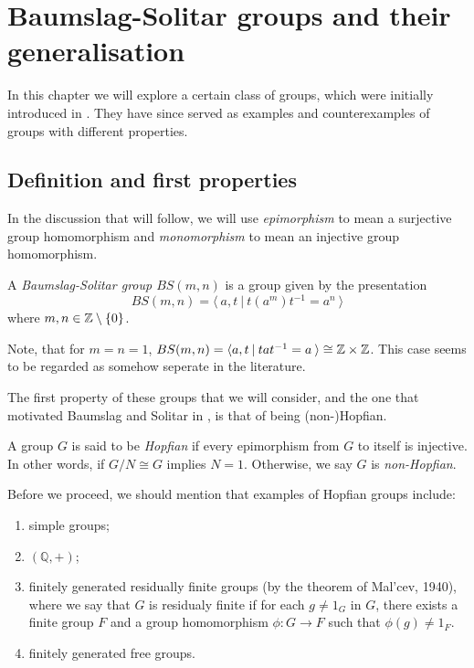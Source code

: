 \pagebreak %

\section{Baumslag-Solitar groups and their generalisation}
\label{BSGroups} %

In this chapter we will explore a certain class of groups, which were initially introduced in \cite{BaSo62}. They have since served as examples and counterexamples of groups with different properties.

\subsection{Definition and first properties}

\begin{remark}
    In the discussion that will follow, we will use \emph{epimorphism} to mean a surjective group homomorphism and \emph{monomorphism} to mean an injective group homomorphism.
\end{remark}

\begin{definition}
    A \emph{Baumslag-Solitar group $BS(m,n)$} is a group given by the presentation \[BS(m,n) = \langle \: a, t\:|\:t(a^m)t^{-1} = a^n \: \rangle \] where $m,n \in \mathbb{Z} \setminus \{0\}$.
\end{definition}

\begin{remark}
    Note, that for $m = n = 1$, $BS(m,n) = \langle a,t \: | \: tat^{-1} = a \: \rangle \cong \mathbb{Z} \times \mathbb{Z}$. This case seems to be regarded as somehow seperate in the literature.
\end{remark}

The first property of these groups that we will consider, and the one that motivated Baumslag and Solitar in \cite{BaSo62}, is that of being (non-)Hopfian.

\begin{definition}
    A group $G$ is said to be \emph{Hopfian} if every epimorphism from $G$ to itself is injective. In other words, if $G/N \cong G$ implies $N = 1$. Otherwise, we say $G$ is \emph{non-Hopfian}.
\end{definition}
    
Before we proceed, we should mention that examples of Hopfian groups include:
\begin{enumerate}
    \item simple groups;
    \item $(\mathbb{Q},+)$;
    \item finitely generated residually finite groups (by the theorem of Mal'cev, 1940), where we say that $G$ is residualy finite if for each $g \neq 1_G$ in $G$, there exists a finite group $F$ and a group homomorphism $\phi: G \to F$ such that $\phi(g) \neq 1_F$.
    \item finitely generated free groups.
\end{enumerate}

